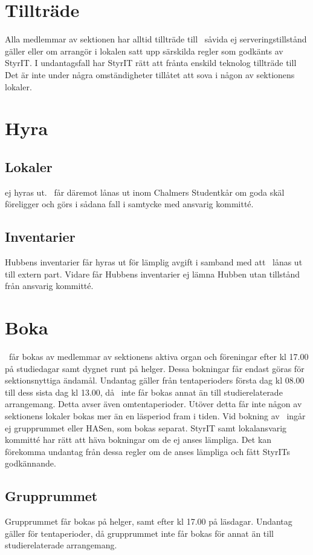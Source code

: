\documentclass[11pt, includeaddress]{classes/cthit}
\begin{document}
\section{Tillträde}
Alla medlemmar av sektionen har alltid tillträde till \HUBBEN\ såvida ej serveringstillstånd gäller eller
om arrangör i lokalen satt upp särskilda regler som godkänts av StyrIT. I undantagsfall har StyrIT rätt
att frånta enskild teknolog tillträde till \HUBBEN\.
Det är inte under några omständigheter tillåtet att sova i någon av sektionens lokaler.


\section{Hyra}
\subsection{Lokaler}
\HUBBEN{} ej hyras ut. \HUBBEN\ får däremot lånas ut inom Chalmers Studentkår om goda skäl
föreligger och görs i sådana fall i samtycke med ansvarig kommitté.

\subsection{Inventarier}
Hubbens inventarier får hyras ut för lämplig avgift i samband med att \HUBBEN\ lånas ut till extern part.
Vidare får Hubbens inventarier ej lämna Hubben utan tillstånd från ansvarig kommitté.


\section{Boka}
\HUBBEN\ får bokas av medlemmar av sektionens aktiva organ och föreningar efter kl 17.00 på
studiedagar samt dygnet runt på helger. Dessa bokningar får endast göras för sektionsnyttiga ändamål.
Undantag gäller från tentaperioders första dag kl 08.00 till dess sista dag kl 13.00, då
\HUBBEN\ inte får bokas annat än till studierelaterade arrangemang. Detta avser även omtentaperioder.
Utöver detta får inte någon av sektionens lokaler bokas mer än en läsperiod fram i tiden.
Vid bokning av \HUBBEN\ ingår ej grupprummet eller HASen, som bokas separat. StyrIT samt
lokalansvarig kommitté har rätt att häva bokningar om de ej anses lämpliga.
Det kan förekomma undantag från dessa regler om de anses lämpliga och fått StyrITs godkännande.

\subsection{Grupprummet}
Grupprummet får bokas på helger, samt efter kl 17.00 på läsdagar. Undantag gäller för tentaperioder, då
grupprummet inte får bokas för annat än till studierelaterade arrangemang.
\end{document}
